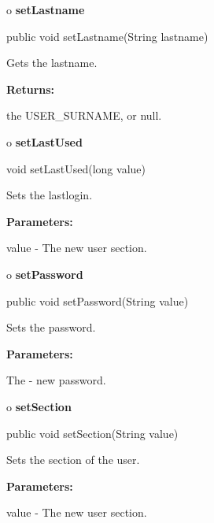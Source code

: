 o {\bf setLastname} 

\begin{PRE}
 public void setLastname(String lastname)
\end{PRE}

\begin{description}
\htmlDD Gets the lastname. 

\begin{description}
\item {\bf Returns:}  

the USER\_SURNAME, or null.  
\end{description}

\end{description}

o {\bf setLastUsed} 

\begin{PRE}
 void setLastUsed(long value)
\end{PRE}

\begin{description}
\htmlDD Sets the lastlogin. 

\begin{description}
\item {\bf Parameters:}  

value - The new user section.  
\end{description}

\end{description}

o {\bf setPassword} 

\begin{PRE}
 public void setPassword(String value)
\end{PRE}

\begin{description}
\htmlDD Sets the password. 

\begin{description}
\item {\bf Parameters:}  

The - new password.  
\end{description}

\end{description}

o {\bf setSection} 

\begin{PRE}
 public void setSection(String value)
\end{PRE}

\begin{description}
\htmlDD Sets the section of the user. 

\begin{description}
\item {\bf Parameters:}  

value - The new user section.  
\end{description}

\end{description}


